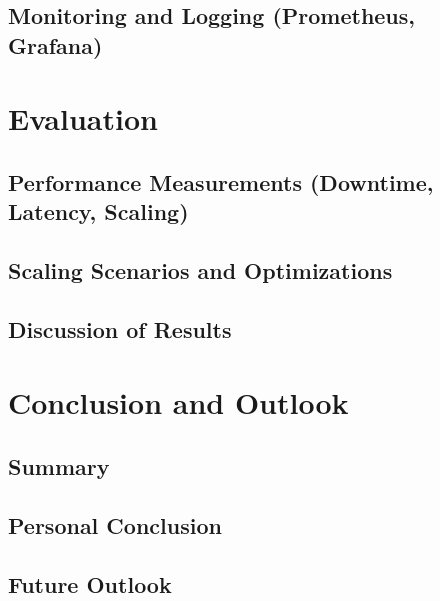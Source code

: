 \documentclass[11pt, a4paper, oneside, listof=totoc]{scrartcl}
\begin{document}
            \cleardoublepage

        \subsection[Monitoring and Logging]{Monitoring and Logging (Prometheus, Grafana)}\label{subsec:monitoring}

    \section{Evaluation}\label{sec:evaluation}

        \subsection[Performance Measurements]{Performance Measurements (Downtime, Latency, Scaling)}\label{subsec:performance}

        \subsection{Scaling Scenarios and Optimizations}\label{subsec:scalingOptimization}

        \subsection{Discussion of Results}\label{subsec:discussion}

    \section{Conclusion and Outlook}\label{sec:conclusion}

        \subsection{Summary}\label{subsec:summary}

        \subsection{Personal Conclusion}\label{subsec:personalConclusion}

        \subsection{Future Outlook}\label{subsec:outlook}

    \cleardoublepage
    \printbibliography[
        title = {References},
        heading = bibintoc
    ]
\end{document}

